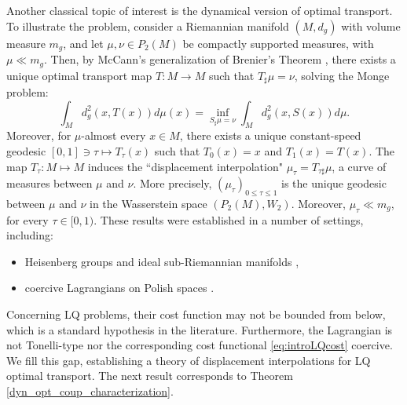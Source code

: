 \documentclass[reqno]{amsart}
\theoremstyle{plain}
\theoremstyle{definition}
\theoremstyle{remark}
\begin{document}
	Another classical topic of interest is the dynamical version of optimal transport. To illustrate the problem, consider a Riemannian manifold $(M,d_g)$ with volume measure $m_g$, and let $\mu,\nu\in P_2(M)$ be compactly supported measures, with $\mu\ll m_g$. Then, by McCann's generalization of Brenier's Theorem \cite{McCann2001}, there exists a unique optimal transport map $T:M\to M$ such that $T_{\sharp}\mu=\nu$, solving the Monge problem:
	\begin{equation}
		\int_{M}d_g^2(x,T(x))d\mu(x)=\inf_{S_{\sharp}\mu=\nu}\int_{M}d_g^2(x,S(x))d\mu.
	\end{equation}
	Moreover, for $\mu$-almost every $x\in M$, there exists a unique constant-speed geodesic $[0,1]\ni \tau\mapsto T_{\tau}(x)$ such that $T_0(x)=x$ and $T_1(x)=T(x)$. The map $T_{\tau}:M\mapsto M$ induces the ``displacement interpolation" $\mu_{\tau}=T_{\tau\sharp}\mu$, a curve of measures between $\mu$ and $\nu$. More precisely, $(\mu_{\tau})_{0\leq \tau\leq 1}$ is the unique geodesic between $\mu$ and $\nu$ in the Wasserstein space $(P_2(M),W_2)$. Moreover, $\mu_\tau\ll m_g$, for every $\tau\in [0,1)$. These results were established in a number of settings, including:
	\begin{itemize}
    \item Heisenberg groups \cite{AMBROSIO2004261,FiJu2008} and ideal sub-Riemannian manifolds \cite{figalli2009masstransSRmflds},
	\item coercive Lagrangians on Polish spaces \cite[Chapter 7 and references therein]{Villanioldandnew}.
	\end{itemize}
	Concerning LQ problems, their cost function may not be bounded from below, which is a standard hypothesis in the literature. Furthermore, the Lagrangian is not Tonelli-type nor  the corresponding cost functional \eqref{eq:introLQcost} coercive. We fill this gap, establishing a theory of displacement interpolations for LQ optimal transport. The next result corresponds to Theorem \ref{dyn_opt_coup_characterization}.
\end{document}
